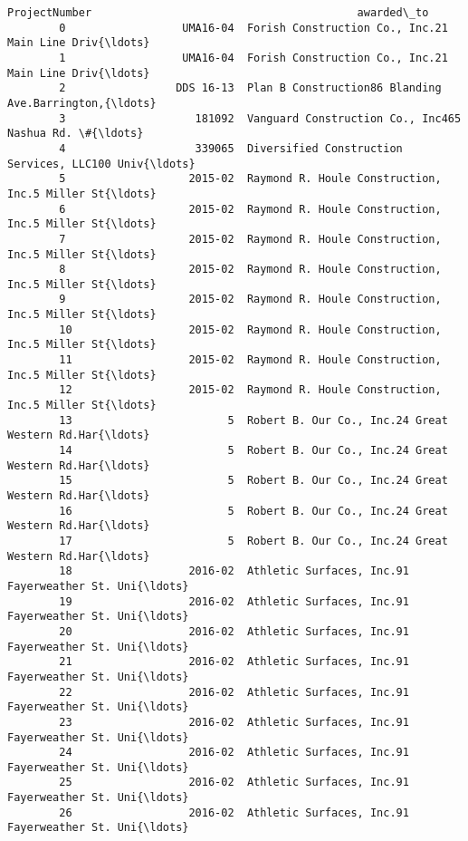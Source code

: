 \documentclass[11pt]{article}
\begin{document}
\begin{Verbatim}[commandchars=\\\{\}]
                      ProjectNumber                                         awarded\_to  
        0                  UMA16-04  Forish Construction Co., Inc.21 Main Line Driv{\ldots}  
        1                  UMA16-04  Forish Construction Co., Inc.21 Main Line Driv{\ldots}  
        2                 DDS 16-13  Plan B Construction86 Blanding Ave.Barrington,{\ldots}  
        3                    181092  Vanguard Construction Co., Inc465 Nashua Rd. \#{\ldots}  
        4                    339065  Diversified Construction Services, LLC100 Univ{\ldots}  
        5                   2015-02  Raymond R. Houle Construction, Inc.5 Miller St{\ldots}  
        6                   2015-02  Raymond R. Houle Construction, Inc.5 Miller St{\ldots}  
        7                   2015-02  Raymond R. Houle Construction, Inc.5 Miller St{\ldots}  
        8                   2015-02  Raymond R. Houle Construction, Inc.5 Miller St{\ldots}  
        9                   2015-02  Raymond R. Houle Construction, Inc.5 Miller St{\ldots}  
        10                  2015-02  Raymond R. Houle Construction, Inc.5 Miller St{\ldots}  
        11                  2015-02  Raymond R. Houle Construction, Inc.5 Miller St{\ldots}  
        12                  2015-02  Raymond R. Houle Construction, Inc.5 Miller St{\ldots}  
        13                        5  Robert B. Our Co., Inc.24 Great Western Rd.Har{\ldots}  
        14                        5  Robert B. Our Co., Inc.24 Great Western Rd.Har{\ldots}  
        15                        5  Robert B. Our Co., Inc.24 Great Western Rd.Har{\ldots}  
        16                        5  Robert B. Our Co., Inc.24 Great Western Rd.Har{\ldots}  
        17                        5  Robert B. Our Co., Inc.24 Great Western Rd.Har{\ldots}  
        18                  2016-02  Athletic Surfaces, Inc.91 Fayerweather St. Uni{\ldots}  
        19                  2016-02  Athletic Surfaces, Inc.91 Fayerweather St. Uni{\ldots}  
        20                  2016-02  Athletic Surfaces, Inc.91 Fayerweather St. Uni{\ldots}  
        21                  2016-02  Athletic Surfaces, Inc.91 Fayerweather St. Uni{\ldots}  
        22                  2016-02  Athletic Surfaces, Inc.91 Fayerweather St. Uni{\ldots}  
        23                  2016-02  Athletic Surfaces, Inc.91 Fayerweather St. Uni{\ldots}  
        24                  2016-02  Athletic Surfaces, Inc.91 Fayerweather St. Uni{\ldots}  
        25                  2016-02  Athletic Surfaces, Inc.91 Fayerweather St. Uni{\ldots}  
        26                  2016-02  Athletic Surfaces, Inc.91 Fayerweather St. Uni{\ldots}  

\end{Verbatim}
\end{document}

